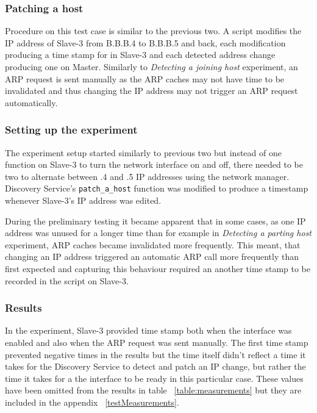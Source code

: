 \subsubsection{Patching a host}

Procedure on this test case is similar to the previous two. A script modifies the IP address of Slave-3 from B.B.B.4 to B.B.B.5 and back, each modification producing a time stamp for in Slave-3 and each detected address change producing one on Master. Similarly to \textit{Detecting a joining host} experiment, an ARP request is sent manually as the ARP caches may not have time to be invalidated and thus changing the IP address may not trigger an ARP request automatically.

\subsubsection*{Setting up the experiment}

The experiment setup started similarly to previous two but instead of one function on Slave-3 to turn the network interface on and off, there needed to be two to alternate between .4 and .5 IP addresses using the network manager. Discovery Service's \verb|patch_a_host| function was modified to produce a timestamp whenever Slave-3's IP address was edited.

During the preliminary testing it became apparent that in some cases, as one IP address was unused for a longer time than for example in \textit{Detecting a parting host} experiment, ARP caches became invalidated more frequently. This meant, that changing an IP address triggered an automatic ARP call more frequently than first expected and capturing this behaviour required an another time stamp to be recorded in the script on Slave-3.

\subsubsection*{Results}

In the experiment, Slave-3 provided time stamp both when the interface was enabled and also when the ARP request was sent manually. The first time stamp prevented negative times in the results but the time itself didn't reflect a time it takes for the Discovery Service to detect and patch an IP change, but rather the time it takes for a the interface to be ready in this particular case. These values have been omitted from the results in table ~\ref{table:measurements} but they are included in the appendix ~\ref{testMeasurements}.

